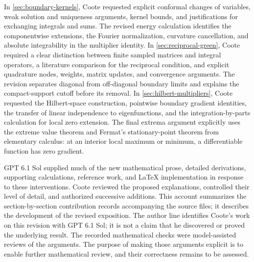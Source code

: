 In \cref{sec:boundary-kernels}, Coote requested explicit
conformal changes of variables, weak solution and uniqueness arguments,
kernel bounds, and justifications for exchanging integrals and sums.
The revised energy calculation identifies the componentwise extensions,
the Fourier normalization, curvature cancellation, and absolute
integrability in the multiplier identity. In \cref{sec:reciprocal-green},
Coote required a clear distinction between finite sampled
matrices and integral operators, a literature comparison for the
reciprocal condition, and explicit quadrature nodes, weights, matrix
updates, and convergence arguments. The revision separates diagonal
from off-diagonal boundary limits and explains the compact-support
cutoff before its removal. In \cref{sec:hilbert-multipliers}, Coote
requested the Hilbert-space construction, pointwise boundary
gradient identities, the transfer of linear independence to
eigenfunctions, and the integration-by-parts calculation for local zero
extension. The final extrema argument explicitly uses the extreme value
theorem and Fermat's stationary-point theorem from elementary calculus:
at an interior local maximum or minimum, a differentiable function has
zero gradient.

GPT 6.1 Sol supplied much of the new mathematical prose, detailed
derivations, supporting calculations, reference work, and LaTeX
implementation in response to these interventions. Coote
reviewed the proposed explanations, controlled their level of detail,
and authorized successive additions. This account summarizes the
section-by-section contribution records accompanying the source files;
it describes the development of the revised exposition. The author line
identifies Coote's work on this revision with GPT 6.1 Sol; it is not a
claim that he discovered or proved the underlying result. The recorded
mathematical checks were model-assisted reviews of the arguments. The
purpose of making those arguments explicit is to enable further
mathematical review, and their correctness remains to be assessed.
